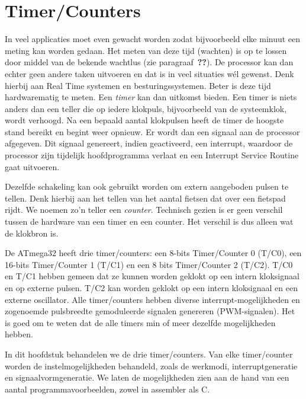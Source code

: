 \chapter{Timer/Counters}
\label{cha:timercounters}
In veel applicaties moet even gewacht worden zodat bijvoorbeeld elke minuut een
meting kan worden gedaan.
 Het meten van deze
tijd (wachten) is op te lossen door middel van de bekende wachtlus (zie
paragraaf~\textbf{??}). De processor kan dan echter geen andere taken
uitvoeren en dat is in veel situaties wél gewenst. Denk hierbij aan Real Time
systemen en besturingssystemen. Beter is deze tijd hardwarematig te meten.
Een \textsl{timer} kan dan uitkomst bieden. Een timer is niets anders dan een
teller die op iedere klokpuls, bijvoorbeeld van de systeemklok, wordt verhoogd.
Na een bepaald aantal klokpulsen heeft de timer de hoogste stand bereikt en
begint weer opnieuw. Er wordt dan een signaal aan de processor afgegeven. Dit
signaal genereert, indien geactiveerd, een interrupt, waardoor de processor
zijn tijdelijk hoofdprogramma verlaat en een Interrupt Service Routine gaat
uitvoeren.

Dezelfde schakeling kan ook gebruikt worden om extern aangeboden pulsen te tellen.
Denk hierbij aan het tellen van het aantal fietsen dat over een fietspad rijdt.
We noemen zo'n teller een \textsl{counter}. Technisch gezien is er geen verschil
tussen de hardware van een timer en een counter. Het verschil is dus alleen wat
de klokbron is.

De ATmega32 heeft drie timer/counters: een 8-bits Timer/Counter 0 (T/C0), een
16-bits Timer/Counter 1 (T/C1) en een 8 bits Timer/Counter 2 (T/C2).
T/C0 en T/C1 hebben gemeen dat
ze kunnen worden geklokt op een intern kloksignaal en op externe pulsen.
T/C2 kan worden geklokt op een intern kloksignaal en een externe oscillator.
Alle timer/counters hebben diverse interrupt-mogelijkheden en zogenoemde
pulsbreedte gemoduleerde signalen genereren (PWM-signalen). Het is goed om
te weten dat de alle timers min of meer dezelfde mogelijkheden hebben.

In dit hoofdstuk behandelen we de drie timer/counters. Van elke timer/counter
worden de instelmogelijkheden behandeld, zoals de werkmodi, interruptgeneratie
en signaalvormgeneratie. We laten de mogelijkheden zien aan de hand van een aantal
programmavoorbeelden, zowel in assembler als C.


